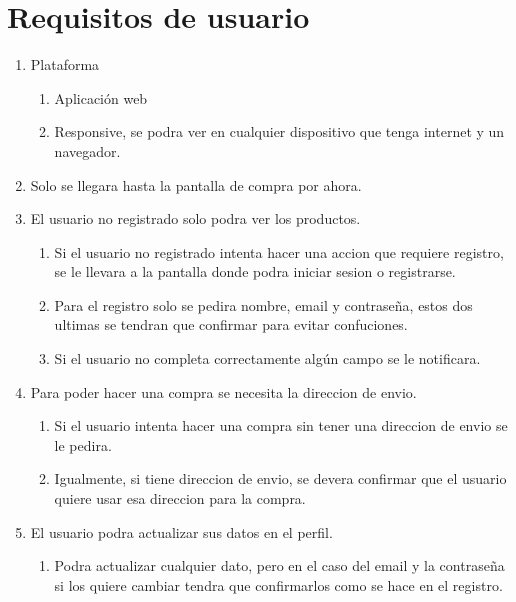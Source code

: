 \documentclass{article}
\begin{document}
\section{Requisitos de usuario}
\begin{enumerate}
	\item Plataforma
		\begin{enumerate}
		\item Aplicación web
		\item Responsive, se podra ver en cualquier dispositivo que tenga internet y un navegador.
		\end{enumerate}
	\item Solo se llegara hasta la pantalla de compra por ahora. 
    \item El usuario no registrado solo podra ver los productos.
		\begin{enumerate}
		\item Si el usuario no registrado intenta hacer una accion que requiere registro, se le llevara a la pantalla donde podra iniciar sesion o registrarse.
		\item Para el registro solo se pedira nombre, email y contraseña, estos dos ultimas se tendran que confirmar para evitar confuciones.
		\item Si el usuario no completa correctamente algún campo se le notificara.
        \end{enumerate}
\newpage
    \item Para poder hacer una compra se necesita la direccion de envio.
		\begin{enumerate}
		\item Si el usuario intenta hacer una compra sin tener una direccion de envio se le pedira.
		\item Igualmente, si tiene direccion de envio, se devera confirmar que el usuario quiere usar esa direccion para la compra.
		\end{enumerate}
    \item El usuario podra actualizar sus datos en el perfil.
		\begin{enumerate}
		\item Podra actualizar cualquier dato, pero en el caso del email y la contraseña si los quiere cambiar tendra que confirmarlos como se hace en el registro.
		\end{enumerate}
\end{enumerate}
\end{document}
